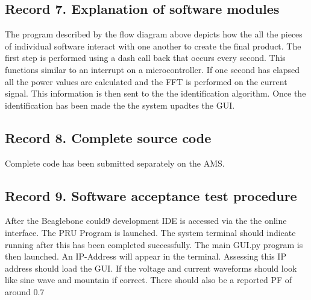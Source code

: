 \begin{figure}[H]
\end{figure}


\subsection{Record 7. Explanation of software modules}

The program described by the flow diagram above depicts how the all the pieces of individual software interact with one another to create the final product. The first step is performed using a dash call back that occurs every second. This functions similar to an interrupt on a microcontroller. If one second has elapsed all the power values are calculated and the FFT is performed on the current signal. This information is then sent to the the identification algorithm. Once the identification has been made the the system upadtes the GUI. 

\subsection{Record 8. Complete source code}
Complete code has been submitted separately on the AMS.

\subsection{Record 9. Software acceptance test procedure}
After the Beaglebone could9 development IDE is accessed via the the online interface. The PRU Program is launched. The system terminal should indicate running after this has been completed successfully. The main GUI.py program is then launched. An IP-Address will appear in the terminal. Assessing this IP address should load the GUI. If the voltage and current waveforms should look like sine wave and mountain if correct. There should also be a reported PF of around 0.7 


